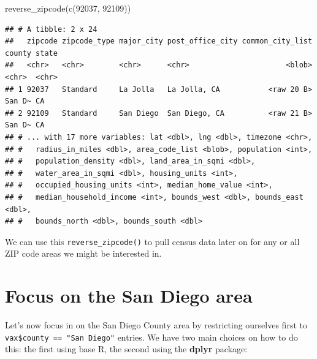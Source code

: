 \documentclass[
]{article}
\newenvironment{Shaded}{\begin{snugshade}}{\end{snugshade}}
\newcommand{\CommentTok}[1]{\textcolor[rgb]{0.56,0.35,0.01}{\textit{#1}}}
\newcommand{\FunctionTok}[1]{\textcolor[rgb]{0.00,0.00,0.00}{#1}}
\newcommand{\NormalTok}[1]{#1}
\newcommand{\OtherTok}[1]{\textcolor[rgb]{0.56,0.35,0.01}{#1}}
\newcommand{\SpecialCharTok}[1]{\textcolor[rgb]{0.00,0.00,0.00}{#1}}
\newcommand{\StringTok}[1]{\textcolor[rgb]{0.31,0.60,0.02}{#1}}
\begin{document}
\begin{Shaded}
\begin{Highlighting}[]
\FunctionTok{reverse\_zipcode}\NormalTok{(}\FunctionTok{c}\NormalTok{(}\StringTok{\textquotesingle{}92037\textquotesingle{}}\NormalTok{, }\StringTok{\textquotesingle{}92109\textquotesingle{}}\NormalTok{))}
\end{Highlighting}
\end{Shaded}

\begin{verbatim}
## # A tibble: 2 x 24
##   zipcode zipcode_type major_city post_office_city common_city_list county state
##   <chr>   <chr>        <chr>      <chr>                      <blob> <chr>  <chr>
## 1 92037   Standard     La Jolla   La Jolla, CA           <raw 20 B> San D~ CA   
## 2 92109   Standard     San Diego  San Diego, CA          <raw 21 B> San D~ CA   
## # ... with 17 more variables: lat <dbl>, lng <dbl>, timezone <chr>,
## #   radius_in_miles <dbl>, area_code_list <blob>, population <int>,
## #   population_density <dbl>, land_area_in_sqmi <dbl>,
## #   water_area_in_sqmi <dbl>, housing_units <int>,
## #   occupied_housing_units <int>, median_home_value <int>,
## #   median_household_income <int>, bounds_west <dbl>, bounds_east <dbl>,
## #   bounds_north <dbl>, bounds_south <dbl>
\end{verbatim}

We can use this \texttt{reverse\_zipcode()} to pull census data later on
for any or all ZIP code areas we might be interested in.

\begin{Shaded}
\end{Shaded}

\hypertarget{focus-on-the-san-diego-area}{%
\section{Focus on the San Diego
area}\label{focus-on-the-san-diego-area}}

Let's now focus in on the San Diego County area by restricting ourselves
first to \texttt{vax\$county\ ==\ "San\ Diego"} entries. We have two
main choices on how to do this: the first using base R, the second using
the \textbf{dplyr} package:
\end{document}
